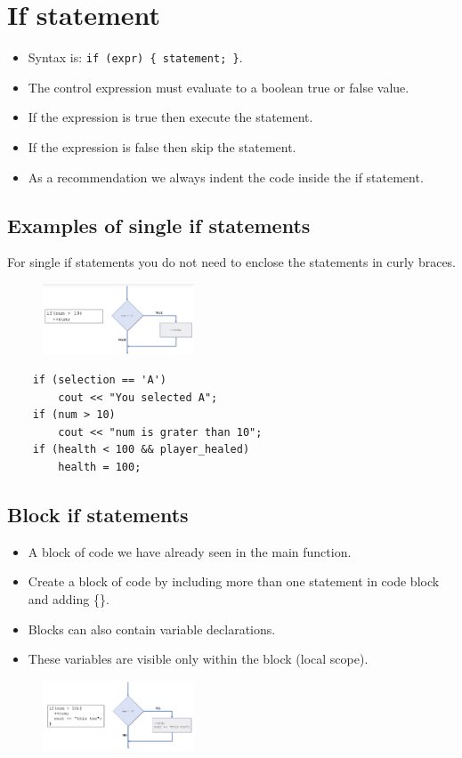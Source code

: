 \section{If statement}
\begin{itemize}
    \item Syntax is: \verb|if (expr) { statement; }|.
    \item The control expression must evaluate to a boolean true or false value.
    \item If the expression is true then execute the statement.
    \item If the expression is false then skip the statement.
    \item As a recommendation we always indent the code inside the if statement.
\end{itemize}

\subsection{Examples of single if statements}
For single if statements you do not need to enclose the statements in curly braces.
\begin{figure}[H]
    \centering
    \includegraphics[width=0.4\textwidth]{./figs/single_if}
\end{figure}
\begin{verbatim}
    if (selection == 'A')
        cout << "You selected A";
    if (num > 10)
        cout << "num is grater than 10";
    if (health < 100 && player_healed)
        health = 100;
\end{verbatim}

\subsection{Block if statements}
\begin{itemize}
    \item A block of code we have already seen in the main function.
    \item Create a block of code by including more than one statement in code block and adding \{\}.
    \item Blocks can also contain variable declarations.
    \item These variables are visible only within the block (local scope).
\end{itemize}
\begin{figure}[H]
    \centering
    \includegraphics[width=0.4\textwidth]{./figs/multi_if}
\end{figure}


